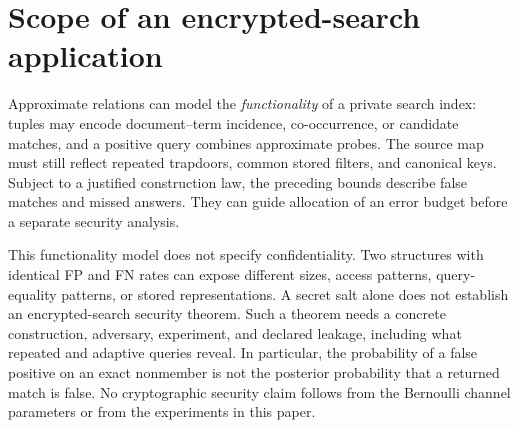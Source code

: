 \documentclass[../main.tex]{subfiles}
\begin{document}
\section{Scope of an encrypted-search application}
\label{sec:trapdoor_rel_model}
Approximate relations can model the \emph{functionality} of a private search
index: tuples may encode document--term incidence, co-occurrence, or candidate
matches, and a positive query combines approximate probes. The source map must
still reflect repeated trapdoors, common stored filters, and canonical keys.
Subject to a justified construction law, the preceding bounds describe false
matches and missed answers. They can guide allocation of an error budget
before a separate security analysis.

This functionality model does not specify confidentiality. Two structures
with identical FP and FN rates can expose different sizes, access patterns,
query-equality patterns, or stored representations. A secret salt alone does
not establish an encrypted-search security theorem. Such a theorem needs a
concrete construction, adversary, experiment, and declared leakage, including
what repeated and adaptive queries reveal. In particular, the probability
of a false positive on an exact nonmember is not the posterior probability
that a returned match is false. No cryptographic security claim follows from
the Bernoulli channel parameters or from the experiments in this paper.
\end{document}

